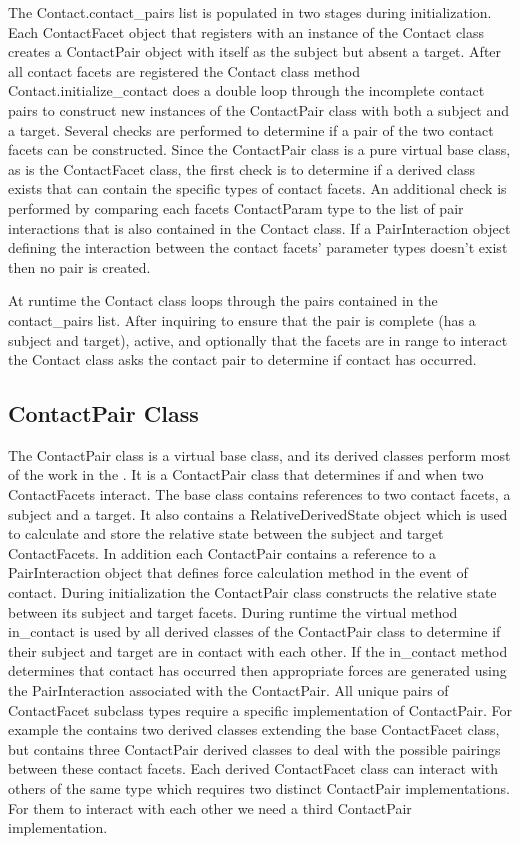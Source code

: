 The Contact.contact\_pairs list is populated in two stages during initialization. Each ContactFacet object that registers with an instance of the Contact class creates a ContactPair object with itself as the subject but absent a target. After all contact facets are registered the Contact class method Contact.initialize\_contact does a double loop through the incomplete contact pairs to construct new instances of the ContactPair class with both a subject and a target. Several checks are performed to determine if a pair of the two contact facets can be constructed.  Since the ContactPair class is a pure virtual base class, as is the ContactFacet class, the first check is to determine if a derived class exists that can contain the specific types of contact facets. An additional check is performed by comparing each facets ContactParam type to the list of pair interactions that is also contained in the Contact class. If a PairInteraction object defining the interaction between the contact facets' parameter types doesn't exist then no pair is created.

At runtime the Contact class loops through the pairs contained in the contact\_pairs list. After inquiring to ensure that the pair is complete (has a subject and target), active, and optionally that the facets are in range to interact the Contact class asks the contact pair to determine if contact has occurred.

\subsection{ContactPair Class}
The ContactPair class is a virtual base class, and its derived classes perform most of the work in the \ModelDesc. It is a ContactPair class that determines if and when two ContactFacets interact. The base class contains references to two contact facets, a subject and a target. It also contains a RelativeDerivedState object which is used to calculate and store the relative state between the subject and target ContactFacets. In addition each ContactPair contains a reference to a PairInteraction object that defines force calculation method in the event of contact. During initialization the ContactPair class constructs the relative state between its subject and target facets. During runtime the virtual method in\_contact is used by all derived classes of the ContactPair class to determine if their subject and target are in contact with each other.  If the in\_contact method determines that contact has occurred then appropriate forces are generated using the PairInteraction associated with the ContactPair.  All unique pairs of ContactFacet subclass types require a specific implementation of ContactPair.  For example the \ModelDesc contains two derived classes extending the base ContactFacet class, but contains three ContactPair derived classes to deal with the possible pairings between these contact facets.  Each derived ContactFacet class can interact with others of the same type which requires two distinct ContactPair implementations.  For them to interact with each other we need a third ContactPair implementation.

